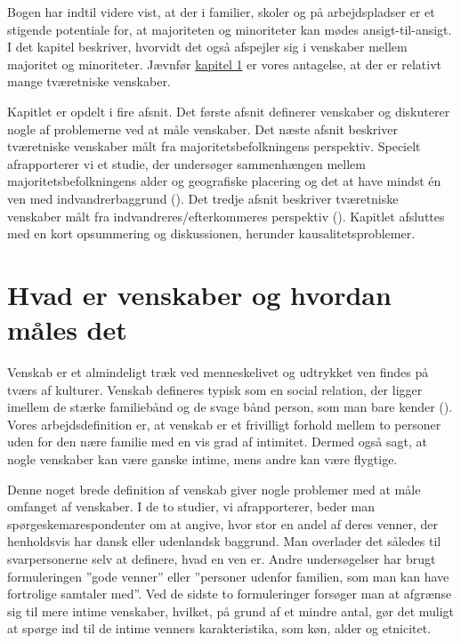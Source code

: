 \documentclass[
]{book}
\begin{document}
\newpage

Bogen har indtil videre vist, at der i familier, skoler og på arbejdspladser er et stigende potentiale for, at majoriteten og minoriteter kan mødes ansigt-til-ansigt. I det kapitel beskriver, hvorvidt det også afspejler sig i venskaber mellem majoritet og minoriteter. Jævnfør \hyperref[kap1]{kapitel 1} er vores antagelse, at der er relativt mange tværetniske venskaber.

Kapitlet er opdelt i fire afsnit. Det første afsnit definerer venskaber og diskuterer nogle af problemerne ved at måle venskaber. Det næste afsnit beskriver tværetniske venskaber målt fra majoritetsbefolkningens perspektiv. Specielt afrapporterer vi et studie, der undersøger sammenhængen mellem majoritetsbefolkningens alder og geografiske placering og det at have mindst én ven med indvandrerbaggrund (). Det tredje afsnit beskriver tværetniske venskaber målt fra indvandreres/efterkommeres perspektiv (). Kapitlet afsluttes med en kort opsummering og diskussionen, herunder kausalitetsproblemer.

\section{Hvad er venskaber og hvordan måles det}\label{hvad-er-venskaber-og-hvordan-muxe5les-det}

Venskab er et almindeligt træk ved menneskelivet og udtrykket ven findes på tværs af kulturer. Venskab defineres typisk som en social relation, der ligger imellem de stærke familiebånd og de svage bånd person, som man bare kender (). Vores arbejdsdefinition er, at venskab er et frivilligt forhold mellem to personer uden for den nære familie med en vis grad af intimitet. Dermed også sagt, at nogle venskaber kan være ganske intime, mens andre kan være flygtige.

Denne noget brede definition af venskab giver nogle problemer med at måle omfanget af venskaber. I de to studier, vi afrapporterer, beder man spørgeskemarespondenter om at angive, hvor stor en andel af deres venner, der henholdsvis har dansk eller udenlandsk baggrund. Man overlader det således til svarpersonerne selv at definere, hvad en ven er. Andre undersøgelser har brugt formuleringen ''gode venner'' eller ''personer udenfor familien, som man kan have fortrolige samtaler med''. Ved de sidste to formuleringer forsøger man at afgrænse sig til mere intime venskaber, hvilket, på grund af et mindre antal, gør det muligt at spørge ind til de intime venners karakteristika, som køn, alder og etnicitet.
\end{document}
